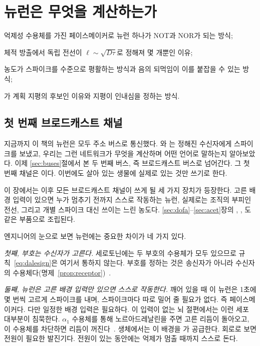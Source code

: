 \chapter{ 뉴런은 무엇을 계산하는가}
\label{sec:serocomputer}
\begin{chaptergoals}
\item 억제성 수용체를 가진 페이스메이커로  뉴런 하나가 NOT과 NOR가 되는 방식;
\item 체적 방출에서 독립 전선이 $\ell\sim\sqrt{D\tau}$로 정해져 몇 개뿐인 이유;
\item 농도가 스파이크를 수준으로 평활하는 방식과 음의 되먹임이 이를 붙잡을 수 있는 방식;
\item {}가 계획 지평의 후보인 이유와 지평이 인내심을 정하는 방식.
\end{chaptergoals}

\section{첫 번째 브로드캐스트 채널}

지금까지 이 책의 뉴런은 모두 주소 버스로 통신했다. 와 는 정해진 수신자에게 스파이크를 보냈고, 우리는 그런 네트워크가 무엇을 계산하며 어떤 언어로 말하는지 알아보았다. 이제 \ref{sec:buses}절에서 본 두 번째 버스, 즉 브로드캐스트 버스로 넘어간다. 그 첫 번째 채널은 이다. 이번에도 살아 있는 생물에 실제로 있는 것만 쓰기로 한다.

이 장에서는 이후 모든 브로드캐스트 채널이 쓰게 될 세 가지 장치가 등장한다. 고른 배경 입력이 있으면 누가 멈추기 전까지 스스로 작동하는 뉴런, 실제로는 조직의 부피인 전선, 그리고 개별 스파이크 대신 쓰이는 느린 농도다. \ref{sec:dofa}--\ref{sec:acet}장의 , , 도 같은 부품으로 조립된다.

엔지니어의 눈으로 보면  뉴런에는 중요한 차이가 네 가지 있다.

\emph{첫째, 부호는 수신자가 고른다.} 세로토닌에는 두 부호의 수용체가 모두 있으므로 규칙~\eqref{eq:dalesign}은 여기서 통하지 않는다. 부호를 정하는 것은 송신자가 아니라 수신자의 수용체다(명제~\ref{prop:receptor})~\cite{BarnesSharp1999}.

\emph{둘째,  뉴런은 고른 배경 입력만 있으면 스스로 작동한다.} 깨어 있을 때 이 뉴런은 1초에 몇 번씩 고르게 스파이크를 내며, 스파이크마다 따로 밀어 줄 필요가 없다. 즉 페이스메이커다. 다만 일정한 배경 입력은 필요하다. 이 입력이 없는 뇌 절편에서는 이런 세포 대부분이 침묵한다. $\alpha_1$ 수용체를 통해 노르아드레날린을 주면 고른 리듬이 돌아오고, 이 수용체를 차단하면 리듬이 꺼진다~\cite{VandermaelenAghajanian1983}. 생체에서는 이 배경을 가 공급한다. 회로로 보면 전원이 필요한 발진기다. 전원이 있는 동안에는 억제가 멈출 때까지 스스로 돈다.


